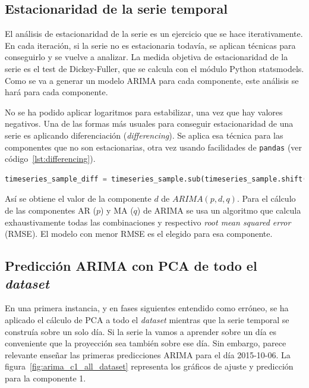 \documentclass[11pt,spanish,listoffigures,listoftables]{tfgetsinf}
\begin{document}
        \subsection{Estacionaridad de la serie temporal}
        El análisis de estacionaridad de la serie es un ejercicio que se hace iterativamente. En cada iteración, si la serie no es estacionaria todavía, se aplican técnicas para conseguirlo y se vuelve a analizar. La medida objetiva de estacionaridad de la serie es el test de Dickey-Fuller, que se calcula con el módulo Python {statsmodels}. Como se va a generar un modelo ARIMA para cada componente, este análisis se hará para cada componente.
        
        No se ha podido aplicar logaritmos para estabilizar, una vez que hay valores negativos. Una de las formas más usuales para conseguir estacionaridad de una serie es aplicando diferenciación ({\em differencing}). Se aplica esa técnica para las componentes que no son estacionarias, otra vez usando facilidades de {\tt pandas} (ver código~\ref{lst:differencing}).
                
        \begin{lstlisting}[language=Python, caption=Diferenciación de la serie usando {\tt pandas}., label={lst:differencing}]
timeseries_sample_diff = timeseries_sample.sub(timeseries_sample.shift())
        \end{lstlisting}
        
        Así se obtiene el valor de la componente \(d\) de \(ARIMA(p, d, q)\). Para el cálculo de las componentes AR (\(p\)) y MA (\(q\)) de ARIMA se usa un algoritmo que calcula exhaustivamente todas las combinaciones y respectivo {\em root mean squared error} (RMSE). El modelo con menor RMSE es el elegido para esa componente.
        
        \subsection{Predicción ARIMA con PCA de todo el {\em dataset}}
        En una primera instancia, y en fases siguientes entendido como erróneo, se ha aplicado el cálculo de PCA a todo el {\em dataset} mientras que la serie temporal se construía sobre un solo día. Si la serie la vamos a aprender sobre un día es conveniente que la proyección sea también sobre ese día. Sin embargo, parece relevante enseñar las primeras predicciones ARIMA para el día 2015-10-06. La figura~\ref{fig:arima_c1_all_dataset} representa los gráficos de ajuste y predicción para la componente 1.
        
\end{document}

